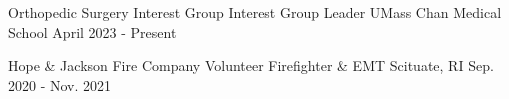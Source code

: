 

\begin{cventries}

\vspace{-1mm}
\cventry
  {Orthopedic Surgery Interest Group} %
  {Interest Group Leader} %
  {UMass Chan Medical School} %
  {April 2023 - Present} %
  {}


  \cventry
    {Hope \& Jackson Fire Company} %
    {Volunteer Firefighter \& EMT} %
    {Scituate, RI} %
    {Sep. 2020 - Nov. 2021} %
    {}

\end{cventries}

